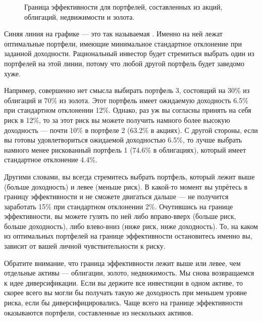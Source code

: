 \begin{figure}[h]

\caption{Граница эффективности для портфелей, составленных из акций, облигаций, недвижимости и золота.}
\label{efficient_frontier}
\end{figure}

Синяя линия на графике --- это так называемая . Именно на ней лежат оптимальные портфели, имеющие минимальное стандартное отклонение при заданной доходности. Рациональный инвестор будет стремиться выбрать один из портфелей на этой линии, потому что любой другой портфель будет заведомо хуже.

Например, совершенно нет смысла выбирать портфель 3, состоящий на 30\% из облигаций и 70\% из золота. Этот портфель имеет ожидаемую доходность 6.5\% при стандартном отклонении 12\%. Однако, раз уж вы согласны принять на себя риск в 12\%, то за этот риск вы можете получить намного более высокую доходность --- почти 10\% в портфеле 2 (63.2\% в акциях). С другой стороны, если вы готовы удовлетвориться ожидаемой доходностью 6.5\%, то лучше выбрать намного менее рискованный портфель 1 (74.6\% в облигациях), который имеет стандартное отклонение 4.4\%.

Другими словами, вы всегда стремитесь выбрать портфель, который лежит выше (больше доходность) и левее (меньше риск). В какой-то момент вы упрётесь в границу эффективности и не сможете двигаться дальше --- не получится заработать 15\% при стандартном отклонении 2\%. Очутившись на границе эффективности, вы можете гулять по ней либо вправо-вверх (больше риск, больше доходность), либо влево-вниз (ниже риск, ниже доходность). То, на каком из оптимальных портфелей на границе эффективности остановитесь именно вы, зависит от вашей личной чувствительности к риску.

Обратите внимание, что граница эффективности лежит выше или левее, чем отдельные активы --- облигации, золото, недвижимость. Мы снова возвращаемся к идее диверсификации. Если вы держите все инвестиции в одном активе, то скорее всего вы могли бы получать такую же доходность при меньшем уровне риска, если бы диверсифицировались. Чаще всего на границе эффективности оказываются портфели, составленные из нескольких активов.

